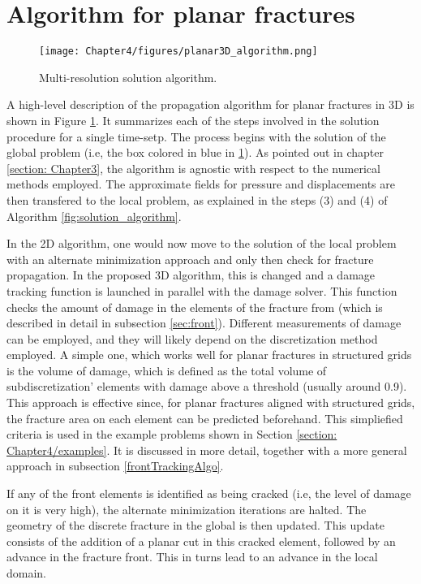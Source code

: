 \section{Algorithm for planar fractures}
\label{section: Chapter4/algo}

\begin{figure}[h]
    \centering
    \texttt{[image: Chapter4/figures/planar3D\_algorithm.png]}
    \caption{Multi-resolution solution algorithm.}
    \label{fig:MR_planar_algo}
\end{figure}

A high-level description of the propagation algorithm for planar fractures in 3D is shown in Figure \ref{fig:MR_planar_algo}. It summarizes each of the steps involved in the solution procedure for a single time-setp. The process begins with the solution of the global problem (i.e, the box colored in blue in \ref{fig:MR_planar_algo}). As pointed out in chapter \ref{section: Chapter3}, the algorithm is agnostic with respect to the numerical methods employed. The approximate fields for pressure and displacements are then transfered to the local problem, as explained in the steps (3) and (4) of Algorithm \ref{fig:solution_algorithm}.

In the 2D algorithm, one would now move to the solution of the local problem with an alternate minimization approach and only then check for fracture propagation. In the proposed 3D algorithm, this is changed and a damage tracking function is launched in parallel with the damage solver. This function checks the amount of damage in the elements of the fracture from (which is described in detail in subsection \ref{sec:front}). Different measurements of damage can be employed, and they will likely depend on the discretization method employed. A simple one, which works well for planar fractures in structured grids is the volume of damage, which is defined as the total volume of subdiscretization' elements with damage above a threshold (usually around 0.9). This approach is effective since, for planar fractures aligned with structured grids, the fracture area on each element can be predicted beforehand. This simpliefied criteria is used in the example problems shown in Section \ref{section: Chapter4/examples}. It is discussed in more detail, together with a more general approach in subsection \ref{frontTrackingAlgo}.

If any of the front elements is identified as being cracked (i.e, the level of damage on it is very high), the alternate minimization iterations are halted. The geometry of the discrete fracture in the global is then updated. This update consists of the addition of a planar cut in this cracked element, followed by an advance in the fracture front. This in turns lead to an advance in the local domain.

